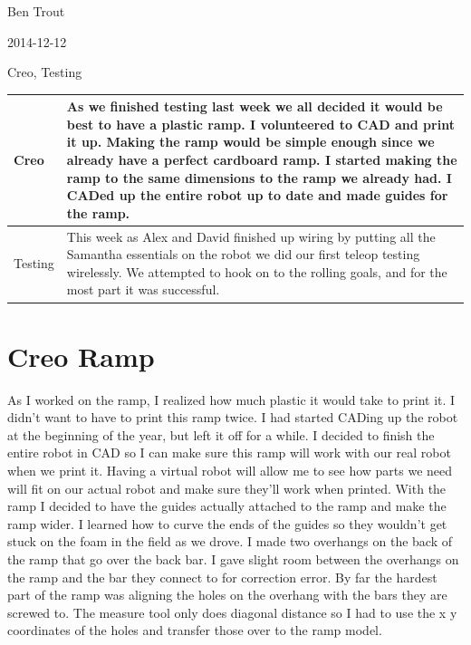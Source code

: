 Ben Trout

2014-12-12

Creo, Testing

\begin{tabular}{|p{5cm}|p{5cm}|}
\hline
Creo&
As we finished testing last week we all decided it would be best to have a plastic ramp. I volunteered to CAD and print it up. Making the ramp would be simple enough since we already have a perfect cardboard ramp. I started making the ramp to the same dimensions to the ramp we already had. I CADed up the entire robot up to date and made guides for the ramp.\\
\hline
Testing&
This week as Alex and David finished up wiring by putting all the Samantha essentials on the robot we did our first teleop testing wirelessly. We attempted to hook on to the rolling goals, and for the most part it was successful.  
\\
\hline
\end{tabular}

\section*{Creo Ramp}
As I worked on the ramp, I realized how much plastic it would take to print it. I didn’t want to have to print this ramp twice. I had started CADing up the robot at the beginning of the year, but left it off for a while. I decided to finish the entire robot in CAD so I can make sure this ramp will work with our real robot when we print it. Having a virtual robot will allow me to see how parts we need will fit on our actual robot and make sure they’ll work when printed. With the ramp I decided to have the guides actually attached to the ramp and make the ramp wider. I learned how to curve the ends of the guides so they wouldn’t get stuck on the foam in the field as we drove. I made two overhangs on the back of the ramp that go over the back bar. I gave slight room between the overhangs on the ramp and the bar they connect to for correction error. By far the hardest part of the ramp was aligning the holes on the overhang with the bars they are screwed to. The measure tool only does diagonal distance so I had to use the x y coordinates of the holes and transfer those over to the ramp model. 

